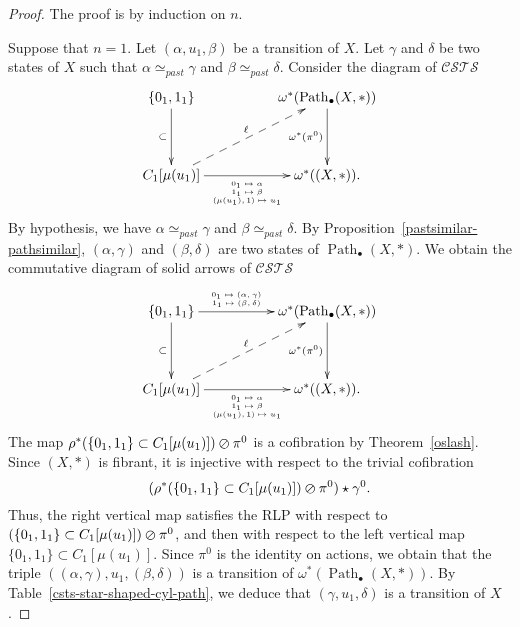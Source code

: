 \documentclass[a4paper,12pt]{amsart}
\begin{document}
\begin{proof} The proof is by induction on $n$.  

Suppose that $n=1$.  Let $(\alpha,u_1,\beta)$ be a transition of
$X$. Let $\gamma$ and $\delta$ be two states of $X$ such that $\alpha
\simeq_{past} \gamma$ and $\beta \simeq_{past} \delta$. Consider the
diagram of ${\mathcal{C\!S\!T\!S}}$
\[
\xymatrix@C=5em@R=4em
{
\{0_1,1_1\} {\ar@{->}[d]_-{{\subset}}}  & \omega^*(\operatorname{{Path}}_\bullet(X,*)) {\ar@{->}[d]_-{{\omega^*(\pi^0)}}} \\ 
C_1[\mu(u_1)] \ar@{-->}[ru]^-{\ell}\ar@{->}[r]_-{\text{\tiny {\(\begin{array}{c}0_1 \mapsto \alpha \\1_1 \mapsto \beta \\(\mu(u_1),1) \mapsto u_1\end{array}\)}}} & \omega^*((X,*)).
}
\]
By hypothesis, we have $\alpha \simeq_{past} \gamma$ and $\beta
\simeq_{past} \delta$. By Proposition~\ref{pastsimilar-pathsimilar},
$(\alpha,\gamma)$ and $(\beta,\delta)$ are two states of
$\operatorname{{Path}}_\bullet(X,*)$. We obtain the commutative diagram of solid
arrows of ${\mathcal{C\!S\!T\!S}}$
\[
\xymatrix@C=5em@R=4em
{
\{0_1,1_1\} {\ar@{->}[d]_-{{\subset}}} {\ar@{->}[r]^-{{\text{\tiny {\(\begin{array}{c}0_1 \mapsto (\alpha,\gamma) \\1_1 \mapsto (\beta,\delta)\end{array}\)}}}}} &\omega^*(\operatorname{{Path}}_\bullet(X,*)) {\ar@{->}[d]_-{{\omega^*(\pi^0)}}} \\ 
C_1[\mu(u_1)] \ar@{-->}[ru]^-{\ell}\ar@{->}[r]_-{\text{\tiny {\(\begin{array}{c}0_1 \mapsto \alpha \\1_1 \mapsto \beta \\(\mu(u_1),1) \mapsto u_1\end{array}\)}}} & \omega^*((X,*)).
}
\]
The map $\rho^*(\{0_1,1_1\} \subset C_1[\mu(u_1)])\varoslash \pi^0$
is a cofibration by Theorem~\ref{oslash}.  Since $(X,*)$ is fibrant,
it is injective with respect to the trivial cofibration
\[(\rho^*(\{0_1,1_1\} \subset C_1[\mu(u_1)])\varoslash \pi^0)\star
\gamma^0.\] Thus, the right vertical map satisfies the RLP with
respect to $(\{0_1,1_1\} \subset C_1[\mu(u_1)])\varoslash \pi^0$, and
then with respect to the left vertical map $\{0_1,1_1\} \subset
C_1[\mu(u_1)]$. Since $\pi^0$ is the identity on actions, we obtain
that the triple $((\alpha,\gamma),u_1,(\beta,\delta))$ is a transition
of $\omega^*(\operatorname{{Path}}_\bullet(X,*))$. By
Table~\ref{csts-star-shaped-cyl-path}, we deduce that
$(\gamma,u_1,\delta)$ is a transition of $X$.  


\end{proof}
\end{document}
